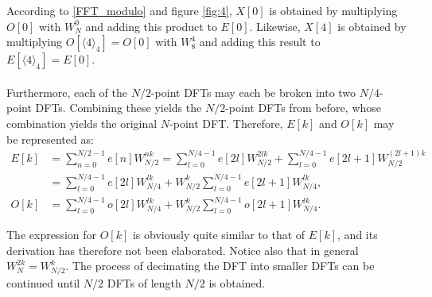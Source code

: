 According to \eqref{FFT_modulo} and figure \ref{fig:4}, $X[0]$ is obtained by multiplying $O[0]$ with $W_N^0$ and adding this product to $E[0]$. Likewise, $X[4]$ is obtained by multiplying $O[\langle 4\rangle_4] = O[0]$ with $W_8^4$ and adding this result to $E[\langle 4\rangle_4] = E[0]$.
\\ \\
Furthermore, each of the $N/2$-point DFTs may each be broken into two $N/4$-point DFTs. Combining these yields the $N/2$-point DFTs from before, whose combination yields the original $N$-point DFT. Therefore, $E[k]$ and $O[k]$ may be represented as:
\begin{align*}
E[k] &= \sum_{n=0}^{N/2-1} e[n] W_{N/2}^{nk} = \sum_{l=0}^{N/4-1} e[2l] W_{N/2}^{2lk} + \sum_{l=0}^{N/4-1} e[2l+1] W_{N/2}^{(2l+1)k} \\
&= \sum_{l=0}^{N/4-1} e[2l] W_{N/4}^{lk} + W_{N/2}^k \sum_{l=0}^{N/4-1} e[2l+1] W_{N/4}^{lk}, \\
O[k] &= \sum_{l=0}^{N/4-1} o[2l] W_{N/4}^{lk} + W_{N/2}^k \sum_{l=0}^{N/4-1} o[2l+1] W_{N/4}^{lk}.
\end{align*}

The expression for $O[k]$ is obviously quite similar to that of $E[k]$, and its derivation has therefore not been elaborated. Notice also that in general $W_N^{2k} = W_{N/2}^k$. The process of decimating the DFT into smaller DFTs can be continued until $N/2$ DFTs of length $N/2$ is obtained.
